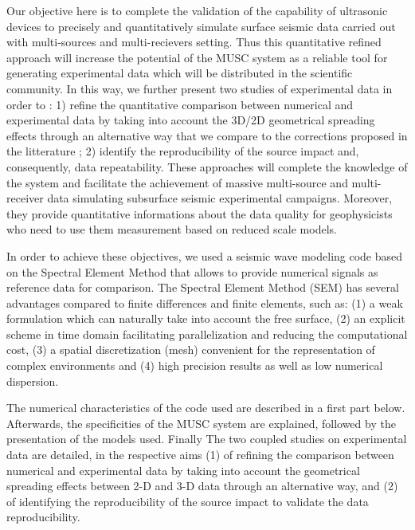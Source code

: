 \documentclass[manuscript,revised]{geophysics}
\newcommand{\twod}{2-D }
\newcommand{\thrd}{3-D }
\begin{document}
\noindent Our objective here is to complete the validation of the capability of ultrasonic devices to precisely and quantitatively simulate surface seismic data carried out with multi-sources and multi-recievers setting. Thus this quantitative refined approach will increase the potential of the MUSC system as a reliable tool for generating experimental data which will be distributed in the scientific community.
\noindent In this way, we further present two studies of experimental data in order to : 1) refine the quantitative comparison between numerical and experimental data by taking into account the 3D/2D geometrical spreading effects through an alternative way that we compare to the corrections proposed in the litterature ; 2) identify the reproducibility of the source impact and, consequently, data repeatability. These approaches will complete the knowledge of the system and facilitate the achievement of massive multi-source and multi-receiver data simulating subsurface seismic experimental campaigns. Moreover, they provide quantitative informations about the data quality for geophysicists who need to use them measurement based on reduced scale models. 

\noindent In order to achieve these objectives, we used a seismic wave modeling code based on the Spectral Element Method \citep{Komatitsch_SEM_1998,Komatitsch_ISM_1999,Komatitsch_SEM_2005,Festa_PML_2005} that allows to provide numerical signals as reference data for comparison. The Spectral Element Method (SEM) has several advantages compared to finite differences and finite elements, such as: (1) a weak formulation which can naturally take into account the free surface, (2) an explicit scheme in time domain facilitating parallelization and reducing the computational cost, (3) a spatial discretization (mesh) convenient for the representation of complex environments and (4) high precision results as well as low numerical dispersion.


\noindent The numerical characteristics of the code used are described in a first part below. Afterwards, the specificities of the MUSC system are explained, followed by the presentation of the models used. Finally The two coupled studies on experimental data are detailed, in the respective aims (1) of refining the comparison between numerical and experimental data by taking into account the geometrical spreading effects between \twod and \thrd data through an alternative way, and (2) of identifying the reproducibility of the source impact to validate the data reproducibility.
\end{document}
